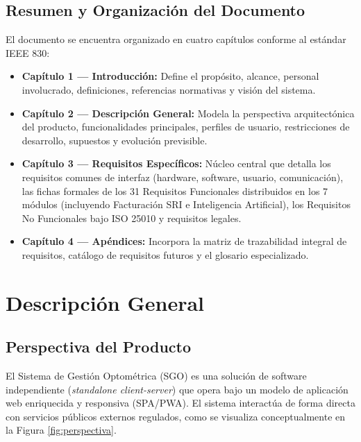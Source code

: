 \documentclass[12pt,a4paper]{report}
\begin{document}
\section{Resumen y Organización del Documento}
El documento se encuentra organizado en cuatro capítulos conforme al estándar IEEE 830:
\begin{itemize}
    \item \textbf{Capítulo 1 --- Introducción:} Define el propósito, alcance, personal involucrado, definiciones, referencias normativas y visión del sistema.
    \item \textbf{Capítulo 2 --- Descripción General:} Modela la perspectiva arquitectónica del producto, funcionalidades principales, perfiles de usuario, restricciones de desarrollo, supuestos y evolución previsible.
    \item \textbf{Capítulo 3 --- Requisitos Específicos:} Núcleo central que detalla los requisitos comunes de interfaz (hardware, software, usuario, comunicación), las fichas formales de los 31 Requisitos Funcionales distribuidos en los 7 módulos (incluyendo Facturación SRI e Inteligencia Artificial), los Requisitos No Funcionales bajo ISO 25010 y requisitos legales.
    \item \textbf{Capítulo 4 --- Apéndices:} Incorpora la matriz de trazabilidad integral de requisitos, catálogo de requisitos futuros y el glosario especializado.
\end{itemize}

\chapter{Descripción General}

\section{Perspectiva del Producto}
El Sistema de Gestión Optométrica (SGO) es una solución de software independiente (\textit{standalone client-server}) que opera bajo un modelo de aplicación web enriquecida y responsiva (SPA/PWA). El sistema interactúa de forma directa con servicios públicos externos regulados, como se visualiza conceptualmente en la Figura \ref{fig:perspectiva}.
\end{document}
